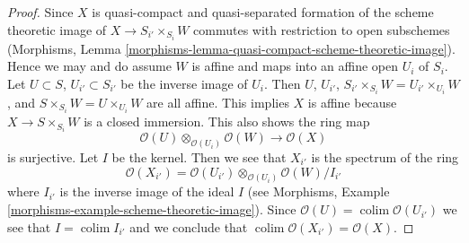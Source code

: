 \documentclass[10pt,a4paper]{amsart}
\theoremstyle{plain}
\theoremstyle{definition}
\theoremstyle{remark}
\numberwithin{equation}{subsection}
\def\colim{\mathop{\mathrm{colim}}\nolimits}
\begin{document}
\begin{proof}
Since $X$ is quasi-compact and quasi-separated formation of the
scheme theoretic image of $X \to S_{i'} \times_{S_i} W$
commutes with restriction to open subschemes
(Morphisms, Lemma \ref{morphisms-lemma-quasi-compact-scheme-theoretic-image}).
Hence we may and do assume $W$ is affine and maps into an affine open
$U_i$ of $S_i$. Let $U \subset S$, $U_{i'} \subset S_{i'}$
be the inverse image of $U_i$. Then $U$, $U_{i'}$, 
$S_{i'} \times_{S_i} W = U_{i'} \times_{U_i} W$, and
$S \times_{S_i} W = U \times_{U_i} W$ are all affine.
This implies $X$ is affine because $X \to S \times_{S_i} W$ is
a closed immersion. This also shows the ring map
$$
\mathcal{O}(U) \otimes_{\mathcal{O}(U_i)} \mathcal{O}(W) \to
\mathcal{O}(X)
$$
is surjective. Let $I$ be the kernel. Then we see that $X_{i'}$
is the spectrum of the ring
$$
\mathcal{O}(X_{i'}) =
\mathcal{O}(U_{i'}) \otimes_{\mathcal{O}(U_i)} \mathcal{O}(W)/I_{i'}
$$
where $I_{i'}$ is the inverse image of the ideal $I$ (see
Morphisms, Example \ref{morphisms-example-scheme-theoretic-image}).
Since $\mathcal{O}(U) = \colim \mathcal{O}(U_{i'})$
we see that $I = \colim I_{i'}$ and we conclude
that $\colim \mathcal{O}(X_{i'}) = \mathcal{O}(X)$.
\end{proof}
\end{document}
